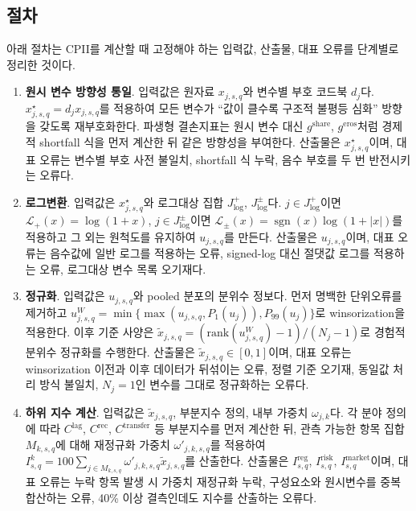 \documentclass[11pt,a4paper]{report}
\newenvironment{summaryenum}{\begin{enumerate}[label=\arabic*.,leftmargin=1.8em,itemsep=0.45em,topsep=0.35em]\RaggedRight}{\end{enumerate}}
\begin{document}
\subsection{절차}
아래 절차는 CPII를 계산할 때 고정해야 하는 입력값, 산출물, 대표 오류를 단계별로 정리한 것이다.
\begingroup
\footnotesize
\begin{summaryenum}
  \item \textbf{원시 변수 방향성 통일}. 입력값은 원자료 $x_{j,s,q}$와 변수별 부호 코드북 $d_j$다. $x^{\star}_{j,s,q}=d_j x_{j,s,q}$를 적용하여 모든 변수가 ``값이 클수록 구조적 불평등 심화'' 방향을 갖도록 재부호화한다. 파생형 결손지표는 원시 변수 대신 $g^{\mathrm{share}}$, $g^{\mathrm{eros}}$처럼 경제적 shortfall 식을 먼저 계산한 뒤 같은 방향성을 부여한다. 산출물은 $x^{\star}_{j,s,q}$이며, 대표 오류는 변수별 부호 사전 불일치, shortfall 식 누락, 음수 부호를 두 번 반전시키는 오류다.
  \item \textbf{로그변환}. 입력값은 $x^{\star}_{j,s,q}$와 로그대상 집합 $J_{\log}^{+}$, $J_{\log}^{\pm}$다. $j \in J_{\log}^{+}$이면 $\mathcal{L}_{+}(x)=\log(1+x)$, $j \in J_{\log}^{\pm}$이면 $\mathcal{L}_{\pm}(x)=\operatorname{sgn}(x)\log(1+|x|)$를 적용하고 그 외는 원척도를 유지하여 $u_{j,s,q}$를 만든다. 산출물은 $u_{j,s,q}$이며, 대표 오류는 음수값에 일반 로그를 적용하는 오류, signed-log 대신 절댓값 로그를 적용하는 오류, 로그대상 변수 목록 오기재다.
  \item \textbf{정규화}. 입력값은 $u_{j,s,q}$와 pooled 분포의 분위수 정보다. 먼저 명백한 단위오류를 제거하고 $u^{W}_{j,s,q}=\min\{\max(u_{j,s,q},P_{1}(u_j)),P_{99}(u_j)\}$로 winsorization을 적용한다. 이후 기준 사양은 $\widetilde{x}_{j,s,q}=(\mathrm{rank}(u^{W}_{j,s,q})-1)/(N_j-1)$로 경험적 분위수 정규화를 수행한다. 산출물은 $\widetilde{x}_{j,s,q}\in[0,1]$이며, 대표 오류는 winsorization 이전과 이후 데이터가 뒤섞이는 오류, 정렬 기준 오기재, 동일값 처리 방식 불일치, $N_j=1$인 변수를 그대로 정규화하는 오류다.
  \item \textbf{하위 지수 계산}. 입력값은 $\widetilde{x}_{j,s,q}$, 부분지수 정의, 내부 가중치 $\omega_{j,k}$다. 각 분야 정의에 따라 $C^{\mathrm{lag}}$, $C^{\mathrm{rec}}$, $C^{\mathrm{transfer}}$ 등 부분지수를 먼저 계산한 뒤, 관측 가능한 항목 집합 $M_{k,s,q}$에 대해 재정규화 가중치 $\omega'_{j,k,s,q}$를 적용하여 $I^{k}_{s,q}=100\sum_{j \in M_{k,s,q}}\omega'_{j,k,s,q}\widetilde{x}_{j,s,q}$를 산출한다. 산출물은 $I^{\mathrm{reg}}_{s,q}$, $I^{\mathrm{risk}}_{s,q}$, $I^{\mathrm{market}}_{s,q}$이며, 대표 오류는 누락 항목 발생 시 가중치 재정규화 누락, 구성요소와 원시변수를 중복 합산하는 오류, 40\% 이상 결측인데도 지수를 산출하는 오류다.

\end{summaryenum}
\end{document}
